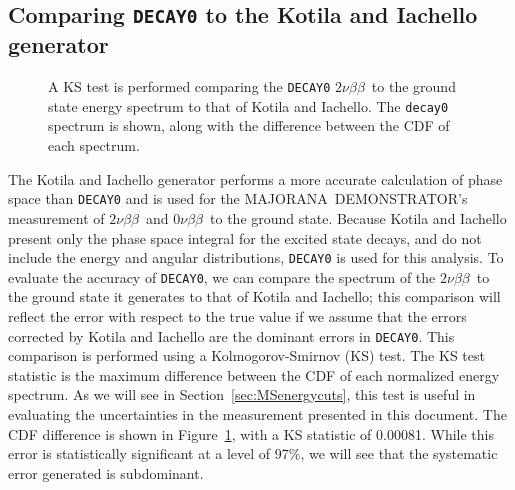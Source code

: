 \documentclass[notitlepage,rmp,aps,10pt]{revtex4-1}
\newcommand{\MJ}{M{\footnotesize AJORANA}}
\newcommand{\Demo}{D{\footnotesize EMON\-STRAT\-OR}}
\newcommand{\MJD}{\MJ\ \Demo}
\newcommand{\znbb}{${0 \nu \beta \beta}$}
\newcommand{\tnbb}{${2 \nu \beta \beta}$}
\begin{document}
\subsection{Comparing \texttt{DECAY0} to the Kotila and Iachello generator} \label{sec:decay0vskandi}
\begin{figure}
  \centering
  \caption[KS test comparing \texttt{decay0} to Kotila and Iachello \tnbb\ to g.s. spectra]{\label{fig:kstest}
    A KS test is performed comparing the \texttt{DECAY0} \tnbb\ to the ground state energy spectrum to that of Kotila and Iachello. The \texttt{decay0} spectrum is shown, along with the difference between the CDF of each spectrum.
  }
\end{figure}
The Kotila and Iachello generator performs a more accurate calculation of phase space than \texttt{DECAY0} and is used for the \MJD 's measurement of \tnbb\ and \znbb\ to the ground state.
Because Kotila and Iachello present only the phase space integral for the excited state decays, and do not include the energy and angular distributions, \texttt{DECAY0} is used for this analysis.
To evaluate the accuracy of \texttt{DECAY0}, we can compare the spectrum of the \tnbb\ to the ground state it generates to that of Kotila and Iachello; this comparison will reflect the error with respect to the true value if we assume that the errors corrected by Kotila and Iachello are the dominant errors in \texttt{DECAY0}.
This comparison is performed using a Kolmogorov-Smirnov (KS) test.
The KS test statistic is the maximum difference between the CDF of each normalized energy spectrum.
As we will see in Section~\ref{sec:MSenergycuts}, this test is useful in evaluating the uncertainties in the measurement presented in this document.
The CDF difference is shown in Figure~\ref{fig:kstest}, with a KS statistic of 0.00081.
While this error is statistically significant at a level of 97\%, we will see that the systematic error generated is subdominant.
\end{document}

